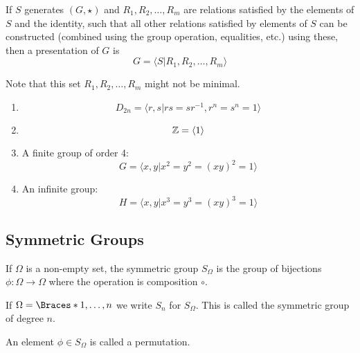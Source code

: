 \documentclass[a5paper]{article}
\begin{document}
\begin{definition}[Presentation]
	If $S$ generates $(G,\star)$ and $R_1,R_2,\ldots,R_m$ are relations satisfied
  by the elements of $S$ and the identity, such that all other relations
  satisfied by elements of $S$ can be constructed (combined using the group
  operation, equalities, etc.) using these, then a presentation of $G$ is
  \begin{equation*}
    G=\langle S|R_1,R_2,\ldots,R_m \rangle
  \end{equation*}

  Note that this set $R_1,R_2,\ldots,R_m$ might not be minimal.
\end{definition}

\begin{example}
	
  \begin{enumerate}
    \item
      \begin{equation*}
        D_{2n}=\langle r,s|rs=sr^{-1},r^n=s^n=1 \rangle
      \end{equation*}
    \item
      \begin{equation*}
        \mathbb{Z}=\langle 1 \rangle
      \end{equation*}
    \item A finite group of order 4:
      \begin{equation*}
        G=\langle x,y | x^2=y^2=(xy)^2=1 \rangle
      \end{equation*}
    \item An infinite group:
      \begin{equation*}
        H=\langle x,y | x^3=y^3=(xy)^3=1 \rangle
      \end{equation*}
  \end{enumerate}
\end{example}

\subsection{Symmetric Groups}
\begin{definition}
	If $\Omega$ is a non-empty set, the symmetric group $S_\Omega$ is the group of
  bijections $\phi:\Omega\to\Omega$ where the operation is composition $\circ$.

  If $\Omega=\braces{1,\ldots,n}$ we write $S_n$ for $S_\Omega$. This is called
  the symmetric group of degree $n$.

  An element $\phi\in S_\Omega$ is called a permutation.
\end{definition}
\end{document}

